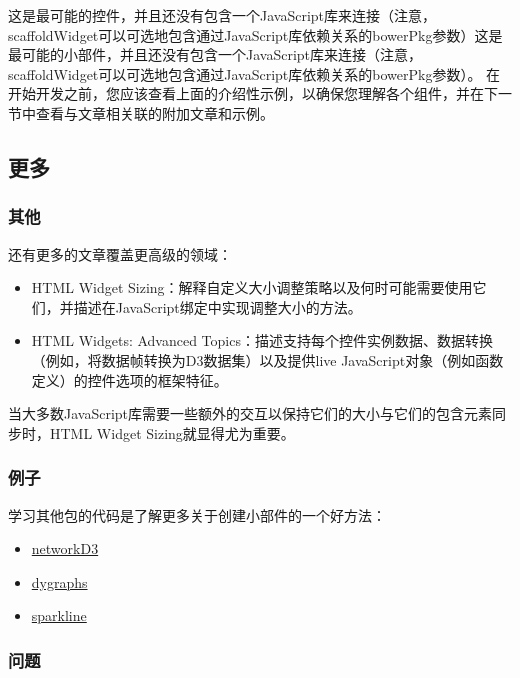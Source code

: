 \documentclass[]{book}
\theoremstyle{definition}
\theoremstyle{definition}
\theoremstyle{definition}
\theoremstyle{remark}
\begin{document}
这是最可能的控件，并且还没有包含一个JavaScript库来连接（注意，scaffoldWidget可以可选地包含通过JavaScript库依赖关系的bowerPkg参数）这是最可能的小部件，并且还没有包含一个JavaScript库来连接（注意，scaffoldWidget可以可选地包含通过JavaScript库依赖关系的bowerPkg参数）。
在开始开发之前，您应该查看上面的介绍性示例，以确保您理解各个组件，并在下一节中查看与文章相关联的附加文章和示例。

\subsection{更多}

\subsubsection{其他}

还有更多的文章覆盖更高级的领域：

\begin{itemize}
\item
  HTML Widget
  Sizing：解释自定义大小调整策略以及何时可能需要使用它们，并描述在JavaScript绑定中实现调整大小的方法。
\item
  HTML Widgets: Advanced
  Topics：描述支持每个控件实例数据、数据转换（例如，将数据帧转换为D3数据集）以及提供live
  JavaScript对象（例如函数定义）的控件选项的框架特征。
\end{itemize}

当大多数JavaScript库需要一些额外的交互以保持它们的大小与它们的包含元素同步时，HTML
Widget Sizing就显得尤为重要。

\subsubsection{例子}

学习其他包的代码是了解更多关于创建小部件的一个好方法：

\begin{itemize}
\item
  \href{https://CRAN.R-project.org/package=networkD3}{networkD3}
\item
  \href{https://CRAN.R-project.org/package=dygraphs}{dygraphs}
\item
  \href{https://github.com/htmlwidgets/sparkline}{sparkline}
\end{itemize}

\subsubsection{问题}
\end{document}
